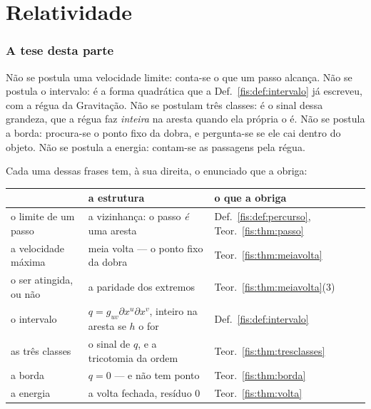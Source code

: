 \documentclass[livro.tex]{subfiles}
\begin{document}
\part{Relatividade}

\section*{A tese desta parte}\label{fis:rel-tese}

\noindent Não se postula uma velocidade limite: conta-se o que um passo alcança.
Não se postula o intervalo: é a forma quadrática que a
Def.~\ref{fis:def:intervalo} já escreveu, com a régua da Gravitação. Não se postulam três classes: é o sinal dessa grandeza, que a régua
faz \emph{inteira} na aresta quando ela própria o é. Não se postula a borda:
procura-se o ponto fixo da dobra, e
pergunta-se se ele cai dentro do objeto. Não se postula a energia: contam-se as
passagens pela régua.

\medskip\noindent Cada uma dessas frases tem, à sua direita, o enunciado que a
obriga:
\begin{center}\small
\begin{tabular}{@{}p{}p{}l@{}}
\toprule
 & \textbf{a estrutura} & \textbf{o que a obriga} \\
\midrule
o limite de um passo & a vizinhança: o passo \emph{é} uma aresta & Def.~\ref{fis:def:percurso}, Teor.~\ref{fis:thm:passo} \\
a velocidade máxima & meia volta --- o ponto fixo da dobra & Teor.~\ref{fis:thm:meiavolta} \\
o ser atingida, ou não & a paridade dos extremos & Teor.~\ref{fis:thm:meiavolta}(3) \\
o intervalo & $q=g_{uv}\partial x^{u}\partial x^{v}$, inteiro na aresta se $h$ o for & Def.~\ref{fis:def:intervalo} \\
as três classes & o sinal de $q$, e a tricotomia da ordem & Teor.~\ref{fis:thm:tresclasses} \\
a borda & $q=0$ --- e não tem ponto & Teor.~\ref{fis:thm:borda} \\
a energia & a volta fechada, resíduo $0$ & Teor.~\ref{fis:thm:volta} \\
\bottomrule
\end{tabular}
\end{center}
\end{document}
